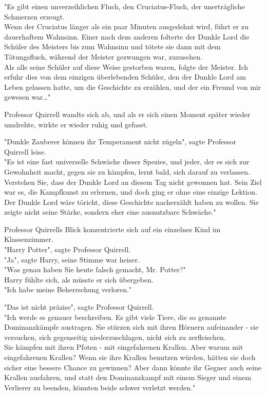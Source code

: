 {"Es gibt einen unverzeihlichen Fluch, den Cruciatus-Fluch, der unerträgliche Schmerzen erzeugt.\\ Wenn der Cruciatus länger als ein paar Minuten ausgedehnt wird, führt er zu dauerhaftem Wahnsinn. Einer nach dem anderen folterte der Dunkle Lord die Schüler des Meisters bis zum Wahnsinn und tötete sie dann mit dem Tötungsfluch, während der Meister gezwungen war, zuzusehen.\\ Als alle seine Schüler auf diese Weise gestorben waren, folgte der Meister. Ich erfuhr dies von dem einzigen überlebenden Schüler, den der Dunkle Lord am Leben gelassen hatte, um die Geschichte zu erzählen, und der ein Freund von mir gewesen war…"

Professor Quirrell wandte sich ab, und als er sich einen Moment später wieder umdrehte, wirkte er wieder ruhig und gefasst.

"Dunkle Zauberer können ihr Temperament nicht zügeln", sagte Professor Quirrell leise.\\ "Es ist eine fast universelle Schwäche dieser Spezies, und jeder, der es sich zur Gewohnheit macht, gegen sie zu kämpfen, lernt bald, sich darauf zu verlassen.\\ Verstehen Sie, dass der Dunkle Lord an diesem Tag nicht gewonnen hat. Sein Ziel war es, die Kampfkunst zu erlernen, und doch ging er ohne eine einzige Lektion.\\ Der Dunkle Lord wäre töricht, diese Geschichte nacherzählt haben zu wollen. Sie zeigte nicht seine Stärke, sondern eher eine ausnutzbare Schwäche."

Professor Quirrells Blick konzentrierte sich auf ein einzelnes Kind im Klassenzimmer.\\ "Harry Potter", sagte Professor Quirrell.\\ "Ja", sagte Harry, seine Stimme war heiser.\\ "Was genau haben Sie heute falsch gemacht, Mr. Potter?"\\ Harry fühlte sich, als müsste er sich übergeben.\\ "Ich habe meine Beherrschung verloren."

"Das ist nicht präzise", sagte Professor Quirrell.\\ "Ich werde es genauer beschreiben. Es gibt viele Tiere, die so genannte Dominanzkämpfe austragen. Sie stürzen sich mit ihren Hörnern aufeinander - sie versuchen, sich gegenseitig niederzuschlagen, nicht sich zu zerfleischen.\\ Sie kämpfen mit ihren Pfoten - mit eingefahrenen Krallen. Aber warum mit eingefahrenen Krallen? Wenn sie ihre Krallen benutzen würden, hätten sie doch sicher eine bessere Chance zu gewinnen? Aber dann könnte ihr Gegner auch seine Krallen ausfahren, und statt den Dominanzkampf mit einem Sieger und einem Verlierer zu beenden, könnten beide schwer verletzt werden."

}
